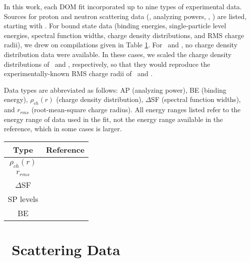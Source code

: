 \label{DOMDataSets}
In this work, each DOM fit incorporated up to nine types of experimental data. Sources for proton
and neutron scattering data (\el, analyzing powers, \rxn, \tot) are listed, starting with \oSix.
For bound state data (binding energies, single-particle level energies, spectral function widths,
charge density distributions, and RMS charge radii), we drew on compilations given in Table
\ref{BoundStateData}. For \oEight\ and \snTwelve, no charge density distribution data were
available. In these cases, we scaled the charge density distributions of \oSix\ and \snFour,
respectively, so that they would reproduce the experimentally-known RMS charge radii of
\oEight\ and \snTwelve.

Data types are abbreviated as follows: AP (analyzing power), BE (binding energy),
$\rho_{ch}(r)$ (charge density distribution), $\Delta$SF (spectral function widths), and
$r_{rms}$ (root-mean-square charge radius). All energy ranges listed refer to the energy range of 
data used in the fit, not the energy range available in the reference, which in some cases is larger.
\\
\begin{table}[htp]
    \label{BoundStateData}
    \centering
    \begin{tabular}{c  c} 
        \toprule
        \bf{Type} & \bf{Reference} \\
        \midrule
        $\rho_{ch}(r)$ & \cite{DeVries1987}\\
        $r_{rms}$ & \cite{DeVries1987}\\
        $\Delta$SF & \cite{Jacob1966, Jacob1973}\\
        SP levels & \cite{AME2016}\\
        BE & \cite{AME2016}\\
        \bottomrule
    \end{tabular}
\end{table}

\pagebreak
\section{\oSix\ Scattering Data}

\begin{table}[htp]
    \small
    \hspace*{\fill}%
    \begin{minipage}[t]{0.47\linewidth}
        \centering
        \vspace{0pt}
        
    \end{minipage}%
    \hfill
    \begin{minipage}[t]{0.47\linewidth}
        \centering
        \vspace{0pt}
        
    \end{minipage}
    \hspace*{\fill}
\end{table}

